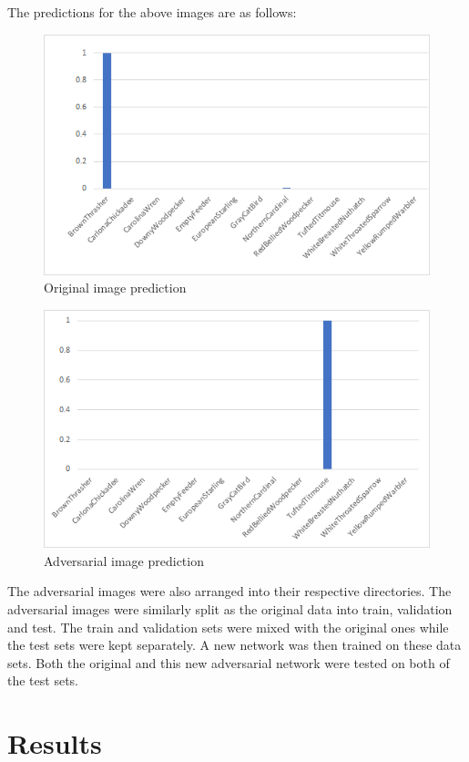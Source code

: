 \documentclass[11pt]{article}
\begin{document}
The predictions for the above images are as follows:
\begin{figure}[H]
\centering
\includegraphics[scale=1.0]{images/Original_predictions.png}
\caption{Original image prediction}
\end{figure}
\begin{figure}[H]
\centering
\includegraphics[scale=1.0]{images/Adversarial_predictions.png}
\caption{Adversarial image prediction}
\end{figure}

\noindent The adversarial images were also arranged into their respective directories. The adversarial images were similarly split as the original data into train, validation and test. The train and validation sets were mixed with the original ones while the test sets were kept separately. A new network was then trained on these data sets. Both the original and this new adversarial network were tested on both of the test sets.
\section{Results}
\label{sec:results}
\end{document}
